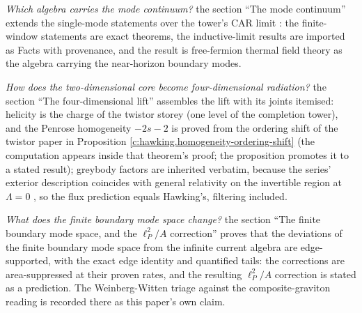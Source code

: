 \documentclass[11pt]{article}
\theoremstyle{definition}
\theoremstyle{plain}
\begin{document}
\emph{Which algebra carries the mode continuum?} the section ``The mode continuum'' extends the single-mode statements over the tower's CAR limit \cite{ButlerT3}: the finite-window statements are exact theorems, the inductive-limit results are imported as Facts with provenance, and the result is free-fermion thermal field theory as the algebra carrying the near-horizon boundary modes.

\emph{How does the two-dimensional core become four-dimensional radiation?} the section ``The four-dimensional lift'' assembles the lift with its joints itemised: helicity is the charge of the twistor storey (one level of the completion tower), and the Penrose homogeneity $-2s-2$ is proved from the ordering shift of the twistor paper \cite[Thm.~5.7]{ButlerT9} in Proposition \ref{c:hawking.homogeneity-ordering-shift} (the computation appears inside that theorem's proof; the proposition promotes it to a stated result); greybody factors are inherited verbatim, because the series' exterior description coincides with general relativity on the invertible region at $\Lambda = 0$ \cite{ButlerT6}, so the flux prediction equals Hawking's, filtering included.

\emph{What does the finite boundary mode space change?} the section ``The finite boundary mode space, and the $\ell_P^2/A$ correction'' proves that the deviations of the finite boundary mode space from the infinite current algebra are edge-supported, with the exact edge identity and quantified tails: the corrections are area-suppressed at their proven rates, and the resulting $\ell_P^2/A$ correction is stated as a prediction. The Weinberg-Witten triage against the composite-graviton reading is recorded there as this paper's own claim.
\end{document}
